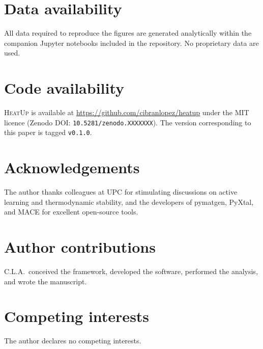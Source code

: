 \documentclass[twocolumn,10pt]{article}
\newcommand{\tp}{\textsc{HeatUp}}
\begin{document}
\section*{Data availability}
All data required to reproduce the figures are generated analytically within the
companion Jupyter notebooks included in the repository.
No proprietary data are used.

\section*{Code availability}
\tp{} is available at \url{https://github.com/cibranlopez/heatup} under
the MIT licence (Zenodo DOI: \texttt{10.5281/zenodo.XXXXXXX}).
The version corresponding to this paper is tagged \texttt{v0.1.0}.

\section*{Acknowledgements}
The author thanks colleagues at UPC for stimulating discussions on active learning
and thermodynamic stability, and the developers of
pymatgen\cite{ong2013python}, PyXtal\cite{fredericks2021pyxtal},
and MACE\cite{batatia2022mace} for excellent open-source tools.

\section*{Author contributions}
C.L.A.\ conceived the framework, developed the software, performed the analysis,
and wrote the manuscript.

\section*{Competing interests}
The author declares no competing interests.



\end{document}
